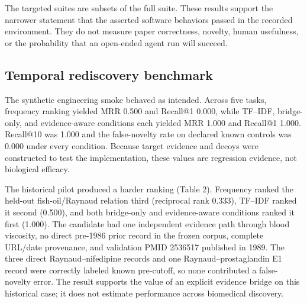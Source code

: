 \documentclass[11pt]{article}
\begin{document}
The targeted suites are subsets of the full suite. These results support the narrower statement that the asserted software behaviors passed in the recorded environment. They do not measure paper correctness, novelty, human usefulness, or the probability that an open-ended agent run will succeed.

\subsection{Temporal rediscovery benchmark}

The synthetic engineering smoke behaved as intended. Across five tasks, frequency ranking yielded MRR 0.500 and Recall@1 0.000, while TF--IDF, bridge-only, and evidence-aware conditions each yielded MRR 1.000 and Recall@1 1.000. Recall@10 was 1.000 and the false-novelty rate on declared known controls was 0.000 under every condition. Because target evidence and decoys were constructed to test the implementation, these values are regression evidence, not biological efficacy.

The historical pilot produced a harder ranking (Table 2). Frequency ranked the held-out fish-oil/Raynaud relation third (reciprocal rank 0.333), TF--IDF ranked it second (0.500), and both bridge-only and evidence-aware conditions ranked it first (1.000). The candidate had one independent evidence path through blood viscosity, no direct pre-1986 prior record in the frozen corpus, complete URL/date provenance, and validation PMID 2536517 published in 1989. The three direct Raynaud--nifedipine records and one Raynaud--prostaglandin E1 record were correctly labeled known pre-cutoff, so none contributed a false-novelty error. The result supports the value of an explicit evidence bridge on this historical case; it does not estimate performance across biomedical discovery.

\begin{table}[H]
\centering
\caption{Historical temporal rediscovery pilot. The benchmark contains one manually curated task.}
\label{tab:table-2}
\small
{}
\end{table}
\end{document}
